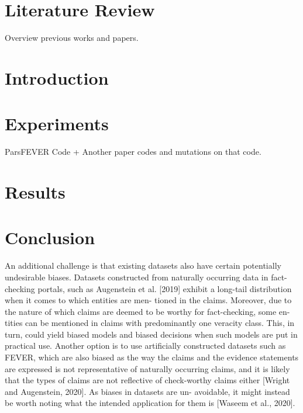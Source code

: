 

\section{Literature Review}
Overview previous works and papers.
\section{Introduction}

\section{Experiments}
ParsFEVER Code + Another paper codes and mutations on that code. 
\section{Results}
\section{Conclusion}

\cite{stance_survey}
An additional challenge is that existing
datasets also have certain potentially undesirable biases.
Datasets constructed from naturally occurring data in fact-
checking portals, such as Augenstein et al. [2019] exhibit a
long-tail distribution when it comes to which entities are men-
tioned in the claims. Moreover, due to the nature of which
claims are deemed to be worthy for fact-checking, some en-
tities can be mentioned in claims with predominantly one
veracity class. This, in turn, could yield biased models and
biased decisions when such models are put in practical use.
Another option is to use artificially constructed datasets such
as FEVER, which are also biased as the way the claims and
the evidence statements are expressed is not representative
of naturally occurring claims, and it is likely that the types
of claims are not reflective of check-worthy claims either
[Wright and Augenstein, 2020]. As biases in datasets are un-
avoidable, it might instead be worth noting what the intended
application for them is [Waseem et al., 2020].



